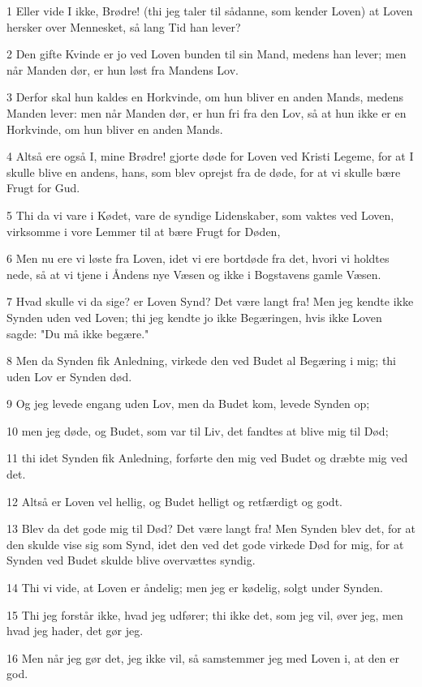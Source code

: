 \par 1 Eller vide I ikke, Brødre! (thi jeg taler til sådanne, som kender Loven) at Loven hersker over Mennesket, så lang Tid han lever?
\par 2 Den gifte Kvinde er jo ved Loven bunden til sin Mand, medens han lever; men når Manden dør, er hun løst fra Mandens Lov.
\par 3 Derfor skal hun kaldes en Horkvinde, om hun bliver en anden Mands, medens Manden lever: men når Manden dør, er hun fri fra den Lov, så at hun ikke er en Horkvinde, om hun bliver en anden Mands.
\par 4 Altså ere også I, mine Brødre! gjorte døde for Loven ved Kristi Legeme, for at I skulle blive en andens, hans, som blev oprejst fra de døde, for at vi skulle bære Frugt for Gud.
\par 5 Thi da vi vare i Kødet, vare de syndige Lidenskaber, som vaktes ved Loven, virksomme i vore Lemmer til at bære Frugt for Døden,
\par 6 Men nu ere vi løste fra Loven, idet vi ere bortdøde fra det, hvori vi holdtes nede, så at vi tjene i Åndens nye Væsen og ikke i Bogstavens gamle Væsen.
\par 7 Hvad skulle vi da sige? er Loven Synd? Det være langt fra! Men jeg kendte ikke Synden uden ved Loven; thi jeg kendte jo ikke Begæringen, hvis ikke Loven sagde: "Du må ikke begære."
\par 8 Men da Synden fik Anledning, virkede den ved Budet al Begæring i mig; thi uden Lov er Synden død.
\par 9 Og jeg levede engang uden Lov, men da Budet kom, levede Synden op;
\par 10 men jeg døde, og Budet, som var til Liv, det fandtes at blive mig til Død;
\par 11 thi idet Synden fik Anledning, forførte den mig ved Budet og dræbte mig ved det.
\par 12 Altså er Loven vel hellig, og Budet helligt og retfærdigt og godt.
\par 13 Blev da det gode mig til Død? Det være langt fra! Men Synden blev det, for at den skulde vise sig som Synd, idet den ved det gode virkede Død for mig, for at Synden ved Budet skulde blive overvættes syndig.
\par 14 Thi vi vide, at Loven er åndelig; men jeg er kødelig, solgt under Synden.
\par 15 Thi jeg forstår ikke, hvad jeg udfører; thi ikke det, som jeg vil, øver jeg, men hvad jeg hader, det gør jeg.
\par 16 Men når jeg gør det, jeg ikke vil, så samstemmer jeg med Loven i, at den er god.
